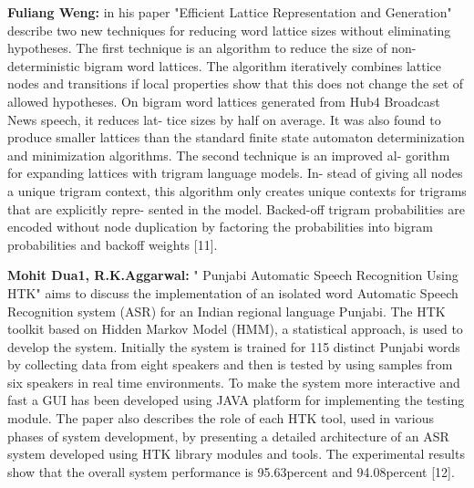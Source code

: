 \documentclass[12pt,a4paper,oneside]{memoir}
\begin{document}
\textbf{Fuliang Weng:} in his paper "Efficient Lattice Representation and Generation" 
describe two
new techniques for reducing word lattice sizes without eliminating
hypotheses. The first technique is an algorithm to reduce the size of
non-deterministic bigram word lattices. The algorithm iteratively
combines lattice nodes and transitions if local properties show that
this does not change the set of allowed hypotheses. On bigram word
lattices generated from Hub4 Broadcast News speech, it reduces lat-
tice sizes by half on average. It was also found to produce smaller
lattices than the standard finite state automaton determinization and
minimization algorithms. The second technique is an improved al-
gorithm for expanding lattices with trigram language models. In-
stead of giving all nodes a unique trigram context, this algorithm
only creates unique contexts for trigrams that are explicitly repre-
sented in the model. Backed-off trigram probabilities are encoded
without node duplication by factoring the probabilities into bigram
probabilities and backoff weights [11].     

\textbf{Mohit Dua1, R.K.Aggarwal:}  " Punjabi Automatic Speech Recognition Using HTK" aims to discuss the implementation of an isolated
word Automatic Speech Recognition system (ASR) for an
Indian regional language Punjabi. The HTK toolkit based on
Hidden Markov Model (HMM), a statistical approach, is used
to develop the system. Initially the system is trained for 115
distinct Punjabi words by collecting data from eight speakers
and then is tested by using samples from six speakers in real
time environments. To make the system more interactive and
fast a GUI has been developed using JAVA platform for
implementing the testing module. The paper also describes the
role of each HTK tool, used in various phases of system
development, by presenting a detailed architecture of an ASR
system developed using HTK library modules and tools. The
experimental results show that the overall system performance
is 95.63percent and 94.08percent [12].       
\end{document}
